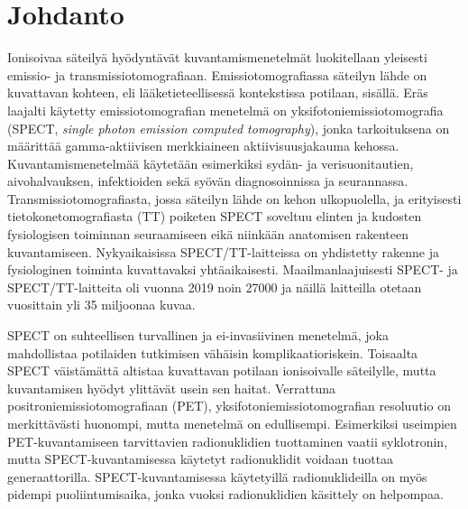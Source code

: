 \section{Johdanto}
Ionisoivaa säteilyä hyödyntävät kuvantamismenetelmät luokitellaan yleisesti emissio- ja transmissiotomografiaan. Emissiotomografiassa säteilyn lähde on kuvattavan kohteen, eli lääketieteellisessä kontekstissa potilaan, sisällä. Eräs laajalti käytetty emissiotomografian menetelmä on yksifotoniemissiotomografia (SPECT, \textit{single photon emission computed tomography}), jonka tarkoituksena on määrittää gamma-aktiivisen merkkiaineen aktiivisuusjakauma kehossa\cite{bruyant_analytic_2002}. Kuvantamismenetelmää käytetään esimerkiksi sydän- ja verisuonitautien, aivohalvauksen, infektioiden sekä syövän diagnosoinnissa ja seurannassa.\cite{cherry_single_2012, van_audenhaege_review_2015, crisan_radiopharmaceuticals_2022, ljungberg_spectct_2018} Transmissiotomografiasta, jossa säteilyn lähde on kehon ulkopuolella\cite{bercovich_medical_2018}, ja erityisesti tietokonetomografiasta (TT) poiketen SPECT soveltuu elinten ja kudosten fysiologisen toiminnan seuraamiseen eikä niinkään anatomisen rakenteen kuvantamiseen\cite{bercovich_medical_2018, crisan_radiopharmaceuticals_2022, cherry_single_2012}. Nykyaikaisissa SPECT/TT-laitteissa on yhdistetty rakenne ja fysiologinen toiminta kuvattavaksi yhtäaikaisesti\cite{hutton_origins_2014, cherry_single_2012, bercovich_medical_2018, ljungberg_spectct_2018}. Maailmanlaajuisesti SPECT- ja SPECT/TT-laitteita oli vuonna 2019 noin 27000\cite{cutler_global_2021} ja näillä laitteilla otetaan vuosittain yli 35 miljoonaa kuvaa\cite{oecd_supply_2019}.

SPECT on suhteellisen turvallinen ja ei-invasiivinen menetelmä, joka mahdollistaa potilaiden tutkimisen vähäisin komplikaatioriskein. Toisaalta SPECT väistämättä altistaa kuvattavan potilaan ionisoivalle säteilylle, mutta kuvantamisen hyödyt ylittävät usein sen haitat.\cite{ljungberg_spectct_2018} Verrattuna positroniemissiotomografiaan (PET), yksifotoniemissiotomografian resoluutio on merkittävästi huonompi, mutta menetelmä on edullisempi\cite{crisan_radiopharmaceuticals_2022, cherry_single_2012}. Esimerkiksi useimpien PET-kuvantamiseen tarvittavien radionuklidien tuottaminen vaatii syklotronin, mutta SPECT-kuvantamisessa käytetyt radionuklidit voidaan tuottaa generaattorilla. SPECT-kuvantamisessa käytetyillä radionuklideilla on myös pidempi puoliintumisaika, jonka vuoksi radionuklidien käsittely on helpompaa.\cite{crisan_radiopharmaceuticals_2022}

